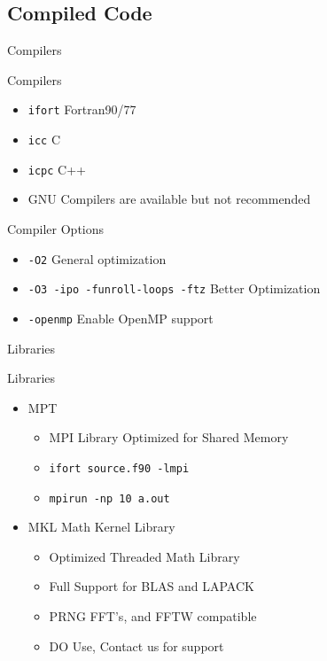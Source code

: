 \documentclass{beamer}
\begin{document}
\subsection{Compiled Code}
\begin{frame}{Compilers}
 \begin{block}{Compilers}
  \begin{itemize}
   \item<1->{\texttt{ifort} Fortran90/77}
   \item<1->{\texttt{icc} C }
   \item<1->{\texttt{icpc} C++}
   \item<2->{GNU Compilers are available but not recommended}
  \end{itemize}
 \end{block}
 \begin{block}{Compiler Options}
  \begin{itemize}
   \item<3->{\texttt{-O2} General optimization}
   \item<3->{\texttt{-O3 -ipo -funroll-loops -ftz} Better Optimization}
   \item<3->{\texttt{-openmp} Enable OpenMP support}
  \end{itemize}
 \end{block}
\end{frame}
\begin{frame}{Libraries}
 \begin{block}{Libraries}
  \begin{itemize}
   \item<1->{MPT}
   \begin{itemize}
    \item<1->{MPI Library Optimized for Shared Memory}
    \item<2->{\texttt{ifort source.f90 -lmpi}}
    \item<2->{\texttt{mpirun -np 10 a.out}}
   \end{itemize}
   \item<3->{MKL Math Kernel Library}
    \begin{itemize}
     \item{Optimized Threaded Math Library}
     \item{Full Support for BLAS and LAPACK}
     \item{PRNG FFT's, and FFTW compatible}
     \item{\alert{DO} Use, Contact us for support}
    \end{itemize}
  \end{itemize}
 \end{block}

\end{frame}
\end{document}

